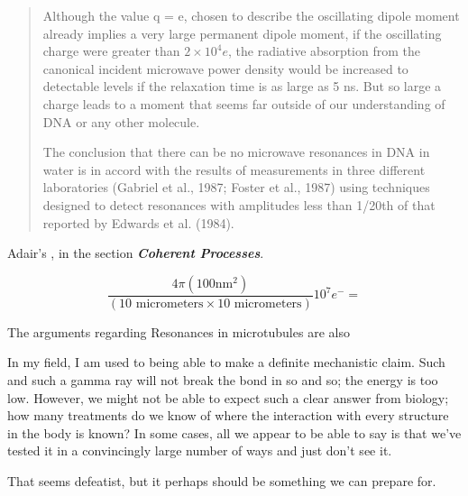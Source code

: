 \documentclass[paper.tex]{subfiles}
\begin{document}
\cite{Vibrational2002}
\begin{quote}
Although the value q = e, chosen to describe the oscillating dipole moment already implies a very large permanent dipole moment, if the oscillating charge were greater
than $2\times 10^4 e$, the radiative absorption from the canonical
incident microwave power density would be increased to
detectable levels if the relaxation time is as large as 5 ns.
But so large a charge leads to a moment that seems far
outside of our understanding of DNA or any other molecule.


The conclusion that there can be no microwave resonances in DNA in water is in accord with the results of
measurements in three different laboratories (Gabriel et al.,
1987; Foster et al., 1987) using techniques designed to
detect resonances with amplitudes less than 1/20th of that
reported by Edwards et al. (1984).
\end{quote}

Adair's \cite{Vibrational2002}, in the section {\it \bf Coherent Processes}. 

$$\frac{4 \pi (100 \text{nm}^2)}{(10 \text{ micrometers} \times 10 \text{ micrometers})} 10^7 e^- = $$

The arguments regarding Resonances in microtubules are also 




In my field, I am used to being able to make a definite mechanistic claim. Such and such a gamma ray will not break the bond in so and so; the energy is too low. However, we might not be able to expect such a clear answer from biology; how many treatments do we know of where the interaction with every structure in the body is known? In some cases, all we appear to be able to say is that we've tested it in a convincingly large number of ways and just don't see it.

That seems defeatist, but it perhaps should be something we can prepare for.


\cite{Identification2018}
\end{document}
